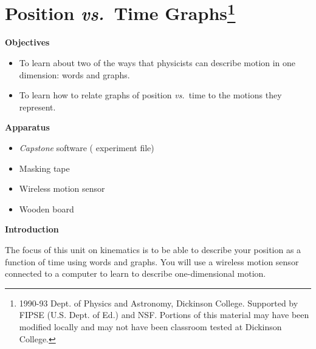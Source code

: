 
\section{Position \textit{vs.}~Time Graphs\footnote{
1990-93 Dept. of Physics and Astronomy, Dickinson College. Supported by FIPSE
(U.S. Dept. of Ed.) and NSF. Portions of this material may have been modified
locally and may not have been classroom tested at Dickinson College.
}}

\makelabheader %

\bigskip

\textbf{Objectives} 

\begin{itemize}[nosep]
\item To learn about two of the ways that physicists can describe motion in one dimension: words and graphs. 
\item To learn how to relate graphs of position \textit{vs.}~time to the motions they represent.
\end{itemize}

\bigskip

\textbf{Apparatus} 

\begin{itemize}[nosep]
\item \textit{Capstone} software ( experiment file) 
\item Masking tape
\item Wireless motion sensor
\item Wooden board
\end{itemize}

\bigskip

\textbf{Introduction} 

The focus of this unit on kinematics is to be able to describe your position
as a function of time using words and graphs. You will use a wireless motion sensor
connected to a computer to learn to describe one-dimensional motion.

